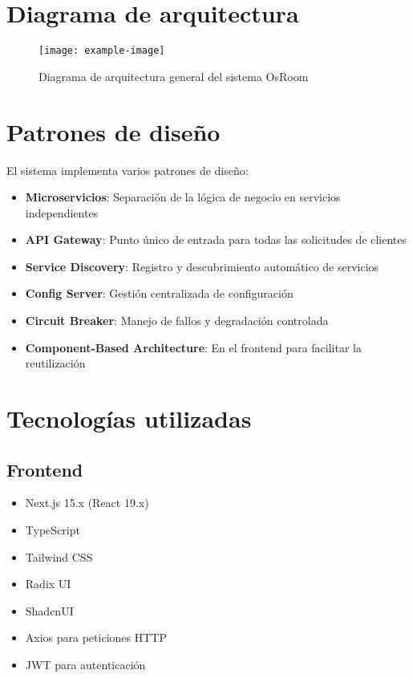 \documentclass[12pt,a4paper]{report}
\begin{document}
\section{Diagrama de arquitectura}
\begin{figure}[H]
    \centering
    \texttt{[image: example-image]}
    \caption{Diagrama de arquitectura general del sistema OsRoom}
    \label{fig:architecture}
\end{figure}

\section{Patrones de diseño}
El sistema implementa varios patrones de diseño:
\begin{itemize}
    \item \textbf{Microservicios}: Separación de la lógica de negocio en servicios independientes
    \item \textbf{API Gateway}: Punto único de entrada para todas las solicitudes de clientes
    \item \textbf{Service Discovery}: Registro y descubrimiento automático de servicios
    \item \textbf{Config Server}: Gestión centralizada de configuración
    \item \textbf{Circuit Breaker}: Manejo de fallos y degradación controlada
    \item \textbf{Component-Based Architecture}: En el frontend para facilitar la reutilización
\end{itemize}

\section{Tecnologías utilizadas}
\subsection{Frontend}
\begin{itemize}
    \item Next.js 15.x (React 19.x)
    \item TypeScript
    \item Tailwind CSS
    \item Radix UI
    \item ShadcnUI
    \item Axios para peticiones HTTP
    \item JWT para autenticación
\end{itemize}
\end{document}

